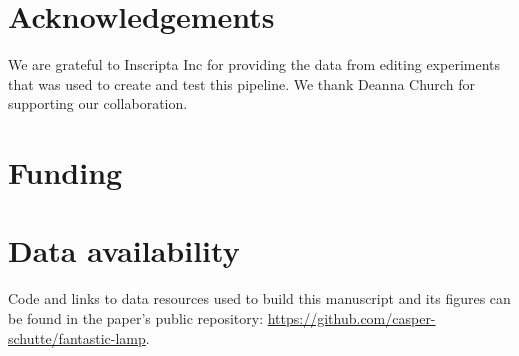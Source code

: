 \documentclass{bioinfo}
\theoremstyle{definition}
\begin{document}
\section*{Acknowledgements}
We are grateful to Inscripta Inc for providing the data from editing experiments that was used to create and test this pipeline. We thank Deanna Church for supporting our collaboration.

\section*{Funding}

\section*{Data availability}
Code and links to data resources used to build this manuscript and its figures can be found in the paper's public repository: \url{https://github.com/casper-schutte/fantastic-lamp}.




\end{document}
